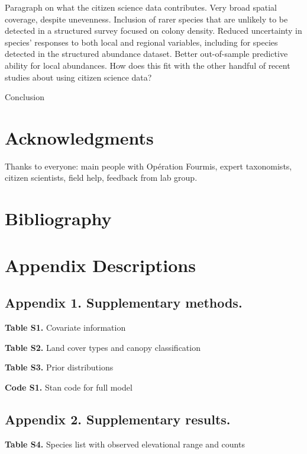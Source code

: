 \documentclass[preprint,review,times,12pt,3p]{elsarticle}
\begin{document}
Paragraph on what the citizen science data contributes. Very broad spatial coverage, despite unevenness. Inclusion of rarer species that are unlikely to be detected in a structured survey focused on colony density. Reduced uncertainty in species' responses to both local and regional variables, including for species detected in the structured abundance dataset. Better out-of-sample predictive ability for local abundances. How does this fit with the other handful of recent studies about using citizen science data?

Conclusion



\section{Acknowledgments}
Thanks to everyone: main people with Opération Fourmis, expert taxonomists, citizen scientists, field help, feedback from lab group.

\newpage
\section{Bibliography}




\newpage
\section{Appendix Descriptions}

\subsection{Appendix 1. Supplementary methods.}

\textbf{Table S1.} Covariate information

\textbf{Table S2.} Land cover types and canopy classification

\textbf{Table S3.} Prior distributions

\textbf{Code S1.} Stan code for full model



\subsection{Appendix 2. Supplementary results.}

\textbf{Table S4.} Species list with observed elevational range and counts
\end{document}
